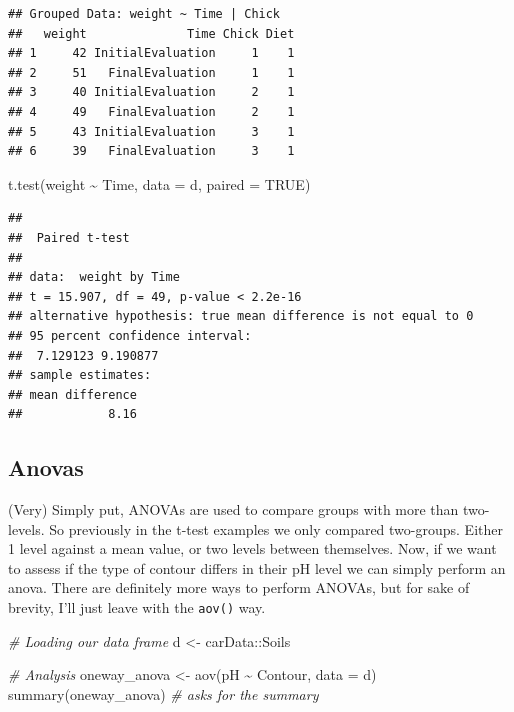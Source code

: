 \documentclass[
]{book}
\newenvironment{Shaded}{\begin{snugshade}}{\end{snugshade}}
\newcommand{\AttributeTok}[1]{\textcolor[rgb]{0.77,0.63,0.00}{#1}}
\newcommand{\CommentTok}[1]{\textcolor[rgb]{0.56,0.35,0.01}{\textit{#1}}}
\newcommand{\ConstantTok}[1]{\textcolor[rgb]{0.00,0.00,0.00}{#1}}
\newcommand{\FunctionTok}[1]{\textcolor[rgb]{0.00,0.00,0.00}{#1}}
\newcommand{\NormalTok}[1]{#1}
\newcommand{\OtherTok}[1]{\textcolor[rgb]{0.56,0.35,0.01}{#1}}
\newcommand{\SpecialCharTok}[1]{\textcolor[rgb]{0.00,0.00,0.00}{#1}}
\begin{document}
\begin{verbatim}
## Grouped Data: weight ~ Time | Chick
##   weight              Time Chick Diet
## 1     42 InitialEvaluation     1    1
## 2     51   FinalEvaluation     1    1
## 3     40 InitialEvaluation     2    1
## 4     49   FinalEvaluation     2    1
## 5     43 InitialEvaluation     3    1
## 6     39   FinalEvaluation     3    1
\end{verbatim}

\begin{Shaded}
\begin{Highlighting}[]
\FunctionTok{t.test}\NormalTok{(weight }\SpecialCharTok{\textasciitilde{}}\NormalTok{ Time, }\AttributeTok{data =}\NormalTok{ d, }\AttributeTok{paired =} \ConstantTok{TRUE}\NormalTok{)}
\end{Highlighting}
\end{Shaded}

\begin{verbatim}
## 
##  Paired t-test
## 
## data:  weight by Time
## t = 15.907, df = 49, p-value < 2.2e-16
## alternative hypothesis: true mean difference is not equal to 0
## 95 percent confidence interval:
##  7.129123 9.190877
## sample estimates:
## mean difference 
##            8.16
\end{verbatim}

\hypertarget{anovas}{%
\subsection{Anovas}\label{anovas}}

(Very) Simply put, ANOVAs are used to compare groups with more than two-levels. So previously in the t-test examples we only compared two-groups. Either 1 level against a mean value, or two levels between themselves.
Now, if we want to assess if the type of contour differs in their pH level we can simply perform an anova. There are definitely more ways to perform ANOVAs, but for sake of brevity, I'll just leave with the \texttt{aov()} way.

\begin{Shaded}
\begin{Highlighting}[]
\CommentTok{\# Loading our data frame}
\NormalTok{d }\OtherTok{\textless{}{-}}\NormalTok{ carData}\SpecialCharTok{::}\NormalTok{Soils}

\CommentTok{\# Analysis}
\NormalTok{oneway\_anova }\OtherTok{\textless{}{-}} \FunctionTok{aov}\NormalTok{(pH }\SpecialCharTok{\textasciitilde{}}\NormalTok{ Contour, }\AttributeTok{data =}\NormalTok{ d)}
\FunctionTok{summary}\NormalTok{(oneway\_anova)  }\CommentTok{\# asks for the summary}
\end{Highlighting}
\end{Shaded}
\end{document}

